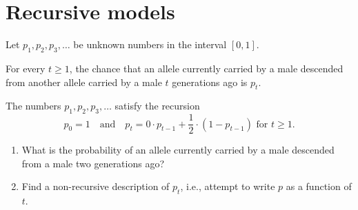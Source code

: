 \documentclass[../main.tex]{subfiles}
\begin{document}
 \section{Recursive models}

\begin{example}
  Let \(p_{1}, p_{2}, p_{3}, \ldots\) be unknown numbers in the interval \([0,1]\).

  For every \(t \ge 1\), the chance that an allele currently carried by a male descended from another allele carried by a male \(t\) generations ago is \(p_{t}\).  

  The numbers \(p_{1}, p_{2}, p_{3}, \ldots\) satisfy the recursion
  \[
     p_{0} = 1 \quad \text{and}\quad p_{t} = 0 \cdot p_{t - 1}  + \frac{1}{2} \cdot (1 - p_{t-1}) \text{ for } t \ge 1.
  \]
  \begin{enumerate}[wide]
    \item What is the probability of an allele currently carried by a male descended from a male two generations ago?
    \item Find a non-recursive description of \(p_{t}\), i.e., attempt to write \(p\) as a function of \(t\).
  \end{enumerate}
\end{example}
\end{document}
